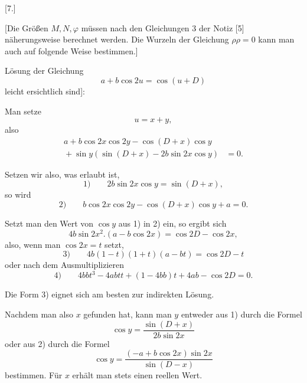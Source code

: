 \clearpage
\begingroup
{}
\renewcommand{\headrulewidth}{0pt}
\par\medskip
{}
\begin{center}[7.]\end{center}
\begingroup
\small
\par\noindent\hspace*{\parindent}[Die Größen \(M,N,\varphi\) müssen nach den Gleichungen 3 der
Notiz [5] näherungsweise berechnet werden. Die Wurzeln der
Gleichung \(\rho\rho=0\) kann man auch auf folgende Weise bestimmen.]
\par\noindent\hspace*{\parindent}Lösung der Gleichung
\[
a+b\cos2u=\cos(u+D)
\]
\noindent[wobei \(u\) für \(E'\) geschrieben ist und die Beziehungen der Konstanten \(a,b,D\)
zu denen der Gleichung 1 der Notiz [5] leicht ersichtlich sind]:
\par\noindent\hspace*{\parindent}Man setze
\[
u=x+y,
\]
\noindent also
\[
\begin{aligned}
a+b\cos2x\cos2y-\cos(D+x)\cos y&\\
{}+\sin y(\sin(D+x)-2b\sin2x\cos y)&=0.
\end{aligned}
\]
\par\noindent\hspace*{\parindent}Setzen wir also, was erlaubt ist,
\[
\text{1)}\qquad 2b\sin2x\cos y=\sin(D+x),
\]
\noindent so wird
\[
\text{2)}\qquad b\cos2x\cos2y-\cos(D+x)\cos y+a=0.
\]
\par\noindent\hspace*{\parindent}Setzt man den Wert von \(\cos y\) aus 1) in 2) ein, so ergibt sich
\[
4b\sin2x^2\mathord{.}(a-b\cos2x)=\cos2D-\cos2x,
\]
\noindent also, wenn man \(\cos2x=t\) setzt,
\[
\text{3)}\qquad 4b(1-t)(1+t)(a-bt)=\cos2D-t
\]
\noindent oder nach dem Ausmultiplizieren
\[
\text{4)}\qquad 4bbt^3-4abtt+(1-4bb)t+4ab-\cos2D=0.
\]
\par\noindent\hspace*{\parindent}Die Form 3) eignet sich am besten zur indirekten Lösung.
\par\noindent\hspace*{\parindent}Nachdem man also \(x\) gefunden hat, kann man \(y\) entweder aus 1) durch
die Formel
\[
\cos y=\frac{\sin(D+x)}{2b\sin2x}
\]
\noindent oder aus 2) durch die Formel
\[
\cos y=\frac{(-a+b\cos2x)\sin2x}{\sin(D-x)}
\]
\noindent bestimmen. Für \(x\) erhält man stets einen reellen Wert.

